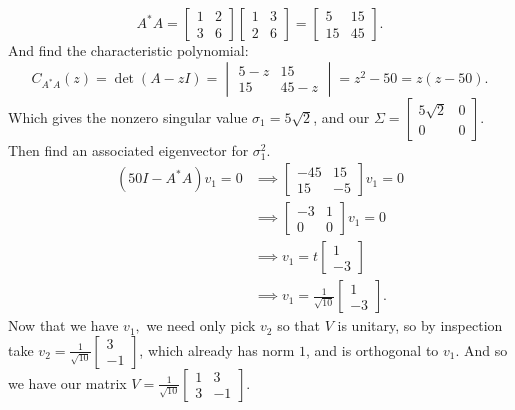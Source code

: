 \documentclass{article}
\begin{document}
\begin{enumerate}
\begin{enumerate}[label= (\alph*)]
\[
    A^* A=\begin{bmatrix} 1&2\\3&6 \end{bmatrix} \begin{bmatrix} 1&3\\2&6 \end{bmatrix} 
    =\begin{bmatrix} 5&15\\15&45 \end{bmatrix} 
.\] 
And find the characteristic polynomial:
\[
    C_{A^* A}(z)=\det(A-zI)=\begin{vmatrix} 5-z&15\\15&45-z \end{vmatrix}= z^2-50=z(z-50)
.\] 
    Which gives the nonzero singular value $\sigma_1=5\sqrt{2} $, and our $\Sigma=\begin{bmatrix} 5\sqrt{2} &0\\0&0 \end{bmatrix} $. Then find an associated eigenvector for $\sigma_1^2$.
    \begin{align*}
        (50I-A^* A)v_1=0&\implies \begin{bmatrix} -45&15\\15&-5 \end{bmatrix}v_1=0 \\
                        &\implies \begin{bmatrix} -3&1\\0&0\end{bmatrix}v_1=0 \\
                        &\implies v_1=t\begin{bmatrix} 1\\-3 \end{bmatrix} \\
                        &\implies v_1=\frac{1}{\sqrt{10} }\begin{bmatrix} 1\\-3 \end{bmatrix} 
    .\end{align*}
    Now that we have $v_1,$ we need only pick $v_2$ so that $V$ is unitary, so by inspection take $v_2=\frac{1}{\sqrt{10} }\begin{bmatrix} 3\\-1 \end{bmatrix} $, which already has norm $1$, and is orthogonal to $v_1$. And so we have our matrix $V=\frac{1}{\sqrt{10} }\begin{bmatrix} 1&3\\3&-1 \end{bmatrix} $.


\end{enumerate}
\end{enumerate}
\end{document}
